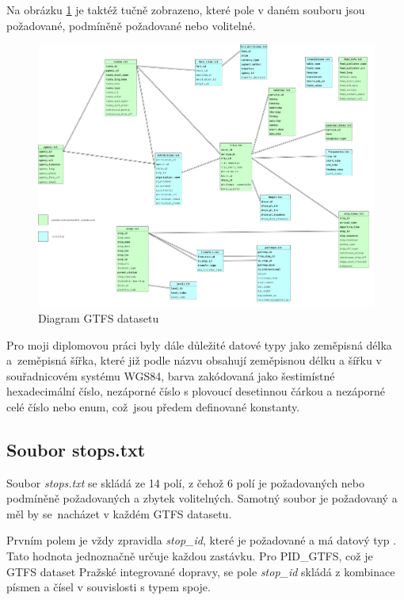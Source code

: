 Na obrázku \ref{fig:GTFS-diagram} je taktéž tučně zobrazeno, které pole v daném  souboru
jsou požadované, podmíněně požadované nebo volitelné.  

\begin{figure}[H] \centering
    \includegraphics[width=400pt]{./pictures/GTFS-diagram.PNG}
    \caption[Diagram GTFS datasetu]{Diagram GTFS datasetu}
	\label{fig:GTFS-diagram}              
\end{figure}

Pro moji diplomovou práci byly dále důležité datové typy jako zeměpisná délka a~zeměpisná šířka,
které již podle názvu obsahují zeměpisnou délku a šířku v souřadnicovém systému WGS84, barva zakódovaná 
jako šestimístné hexadecimální číslo, nezáporné číslo s plovoucí desetinnou čárkou a nezáporné celé číslo
nebo enum, což~jsou předem definované konstanty.

\subsection{Soubor stops.txt}
\label{stops.txt}
Soubor \textit{stops.txt} se skládá ze 14 polí, z čehož 6 polí je požadovaných nebo podmíněně požadovaných 
a zbytek volitelných. Samotný soubor je požadovaný a měl by se~nacházet v každém GTFS datasetu.

Prvním polem je vždy zpravidla \textit{stop\_id}, které je požadované a má datový typ .
Tato hodnota jednoznačně určuje každou zastávku. Pro PID\_GTFS, což je GTFS dataset Pražské integrované dopravy,
se pole \textit{stop\_id} skládá z kombinace písmen a čísel v souvislosti s typem spoje.

